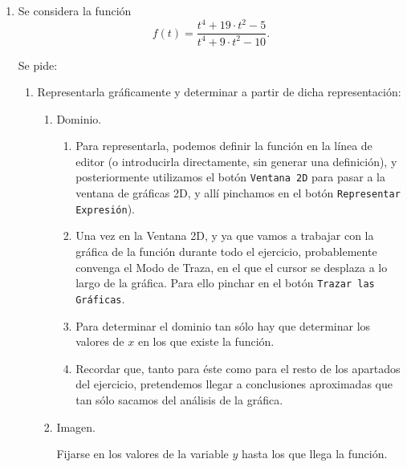 \begin{enumerate}[leftmargin=*]
	\item Se considera la función
	      \[
	      	f(t)=\frac{t^{4} +19\cdot t^{2} - 5}{t^{4} +9\cdot t^{2} - 10}.
	      \]
	      
	      Se pide: 
	      \begin{enumerate}
	      	\item Representarla gráficamente y determinar a partir de dicha representación:
	      	      
	      	      \begin{enumerate}
	      	      	\item  Dominio.
	      	      	      \begin{indication}
	      	      	      	\begin{enumerate}
	      	      	      		\item Para representarla, podemos definir la función en la línea de editor (o introducirla directamente, sin generar una definición), y
	      	      	      		      posteriormente utilizamos el botón \texttt{Ventana 2D} para pasar a la ventana de gráficas 2D, y allí pinchamos en el botón
	      	      	      		      \texttt{Representar Expresión}).
	      	      	      		\item Una vez en la Ventana 2D, y ya que vamos a trabajar con la gráfica de la función durante todo el ejercicio, probablemente convenga el
	      	      	      		      Modo de Traza, en el que el cursor se desplaza a lo largo de la gráfica. Para ello pinchar en el botón \texttt{Trazar las Gráficas}.
	      	      	      		\item Para determinar el dominio tan sólo hay que determinar los valores de $x$ en los que existe la función.
	      	      	      		\item Recordar que, tanto para éste como para el resto de los apartados del ejercicio, pretendemos llegar a conclusiones aproximadas que tan
	      	      	      		      sólo sacamos del análisis de la gráfica.
	      	      	      	\end{enumerate}
	      	      	      \end{indication}
	      	      	      
	      	      	\item  Imagen.
	      	      	      \begin{indication}
	      	      	      	Fijarse en los valores de la variable $y$ hasta los que llega la función.
	      	      	      \end{indication}
	      	      	      

\end{enumerate}
\end{enumerate}
\end{enumerate}
